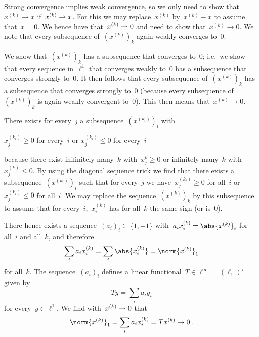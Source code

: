 \subsection{}

Strong convergence implies weak convergence, so we only need to show that~$x^{(k)} \to x$ if~$x^{(k)} \rightharpoonup x$.
For this we may replace~$x^{(k)}$ by~$x^{(k)} - x$ to assume that~$x = 0$.
We hence have that~$x^{(k)} \rightharpoonup 0$ and need to show that~$x^{(k)} \to 0$.
We note that every subsequence of~$(x^{(k)})_k$ again weakly converges to~$0$.

We show that~$(x^{(k)})_k$ has a subsequence that converges to~$0$;
i.e.\ we show that every sequence in~$\ell^1$ that converges weakly to~$0$ has a subsequence that converges strongly to~$0$.
It then follows that every subsequence of~$(x^{(k)})_k$ has a subsequence that converges strongly to~$0$ (because every subsequence of~$(x^{(k)})_k$ is again weakly convergent to~$0$).
This then means that~$x^{(k)} \to 0$.

There exists for every~$j$ a subsequence~$(x^{(k_i)})_i$ with
\begin{center}
  $x^{(k_i)}_j \geq 0$ for every~$i$ \qquad or \qquad $x^{(k_i)}_j \leq 0$ for every~$i$
\end{center}
because there exist inifinitely many~$k$ with~$x^k_j \geq 0$ or infinitely many~$k$ with~$x^{(k)}_j \leq 0$.
By using the diagonal sequence trick we find that there exists a subsequence~$(x^{(k_i)})_i$ such that for every~$j$ we have~$x^{(k_i)}_j \geq 0$ for all~$i$ or~$x^{(k_i)}_j \leq 0$ for all~$i$.
We may replace the sequence~$(x^{(k)})_k$ by this subsequence to assume that for every~$i$,~$x^{(k)}_i$ has for all~$k$ the same sign (or is~$0$).

There hence exists a sequence~$(a_i)_i \subseteq \{1,-1\}$ with~$a_i x^{(k)}_i = \abs{x^{(k)}}_i$ for all~$i$ and all~$k$, and therefore
\[
  \sum_i a_i x^{(k)}_i
  =
  \sum_i \abs{x^{(k)}_i}
  =
  \norm{ x^{(k)} }_1
\]
for all~$k$.
The sequence~$(a_i)_i$ defines a linear functional~$T \in \ell^\infty = (\ell_1)'$ given by
\[
  T y
  =
  \sum_i a_i y_i
\]
for every~$y \in \ell^1$.
We find with~$x^{(k)} \rightharpoonup 0$ that
\[
  \norm{ x^{(k)} }_1
  =
  \sum_i a_i x^{(k)}_i
  =
  T x^{(k)}
  \to
  0 \,.
\]




